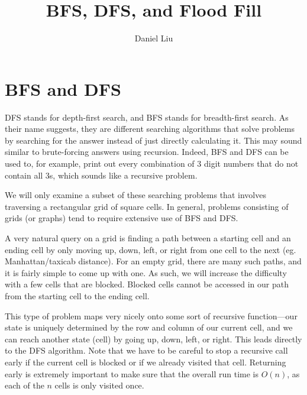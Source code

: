 \documentclass{article}
\title{BFS, DFS, and Flood Fill}
\author{Daniel Liu}
\begin{document}
    \maketitle

    \section{BFS and DFS}
    DFS stands for depth-first search, and BFS stands for breadth-first search. As their name suggests, they are different searching algorithms that solve problems by searching for the answer instead of just directly calculating it. This may sound similar to brute-forcing answers using recursion. Indeed, BFS and DFS can be used to, for example, print out every combination of 3 digit numbers that do not contain all 3s, which sounds like a recursive problem.

    We will only examine a subset of these searching problems that involves traversing a rectangular grid of square cells. In general, problems consisting of grids (or graphs) tend to require extensive use of BFS and DFS.

    A very natural query on a grid is finding a path between a starting cell and an ending cell by only moving up, down, left, or right from one cell to the next (eg. Manhattan/taxicab distance). For an empty grid, there are many such paths, and it is fairly simple to come up with one. As such, we will increase the difficulty with a few cells that are blocked. Blocked cells cannot be accessed in our path from the starting cell to the ending cell.

    This type of problem maps very nicely onto some sort of recursive function---our state is uniquely determined by the row and column of our current cell, and we can reach another state (cell) by going up, down, left, or right. This leads directly to the DFS algorithm. Note that we have to be careful to stop a recursive call early if the current cell is blocked or if we already visited that cell. Returning early is extremely important to make sure that the overall run time is $O(n)$, as each of the $n$ cells is only visited once.
\end{document}
